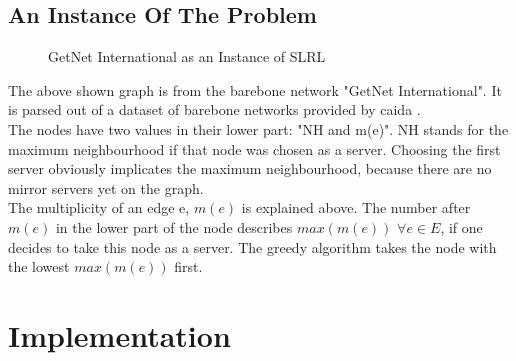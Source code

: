 \documentclass [12pt]{article}
\begin{document}
\subsection{An Instance Of The Problem}
\begin{figure}[H]
  \centering
{}
  \caption{GetNet International as an Instance of SLRL}
\end{figure}
The above shown graph is from the barebone network "GetNet International".
It is parsed out of a dataset of barebone networks provided by caida \cite{caidabarebones}.
\\
The nodes have two values in their lower part: "NH and m(e)". NH stands for 
the maximum neighbourhood if that node was chosen as a server. Choosing the first
server obviously implicates the maximum neighbourhood, because there are
no mirror servers yet on the graph.\\
The multiplicity of an edge e, $m(e)$ is explained above. The number after
$m(e)$ in the lower part of the node describes $max(m(e))$ $ \forall e \in E$,
if one decides to take this node as a server.
The greedy algorithm takes the node with the lowest $max(m(e))$ first.

\section{Implementation}
\end{document}
